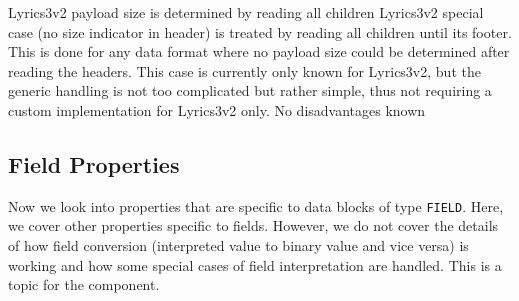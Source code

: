 {%
Lyrics3v2 payload size is determined by reading all children
}
{%
Lyrics3v2 special case (no size indicator in header) is treated by reading all children until its footer. This is done for any data format where no payload size could be determined after reading the headers.
}
{%
This case is currently only known for Lyrics3v2, but the generic handling is not too complicated but rather simple, thus not requiring a custom implementation for Lyrics3v2 only.
}
{%
No disadvantages known
}

\subsection{Field Properties}%
\label{sec:FieldProperties}%

Now we look into properties that are specific to data blocks of type \texttt{FIELD}. Here, we cover other properties specific to fields. However, we do not cover the details of how field conversion (interpreted value to binary value and vice versa) is working and how some special cases of field interpretation are handled. This is a topic for the \COMPdataPartManagement{} component. 

